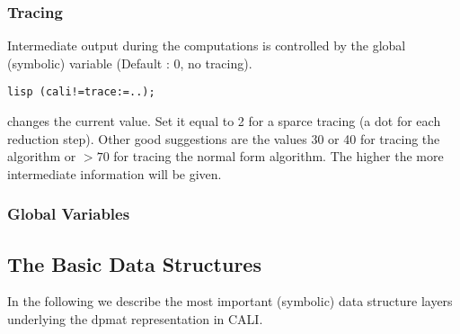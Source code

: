 \subsubsection*{Tracing}

Intermediate output during the computations is controlled by the
global (symbolic) variable  (Default : 0, no
tracing).
\begin{verbatim}
lisp (cali!=trace:=..);
\end{verbatim}
changes the current value. Set it equal to 2 for a sparce tracing (a dot for
each reduction step).
Other good suggestions are the values 30 or 40 for tracing the \gr
algorithm or $>70$ for tracing the normal form algorithm. The higher
 the more intermediate information will be given.

\subsubsection*{Global Variables}

\begin{quote}










\end{quote}

\subsection{The Basic Data Structures}

In the following we describe the most important (symbolic) data
structure layers underlying the dpmat representation in CALI.

